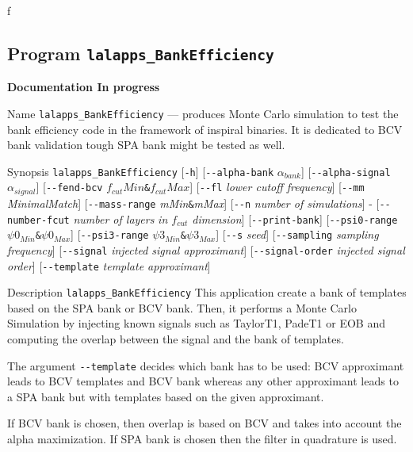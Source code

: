 f\subsection{Program \texttt{lalapps\_BankEfficiency}}
\label{program:lalapps-BankEfficiency}
{\LARGE{{\bf Documentation In progress}}}

\begin{entry}

\item[Name]
\verb$lalapps_BankEfficiency$ --- produces Monte Carlo simulation to test the bank efficiency
code in the framework of inspiral binaries. It is dedicated to BCV bank validation tough 
SPA bank might be tested as well.

\item[Synopsis]
\verb$lalapps_BankEfficiency$ [\verb$-h$] 
[\verb$--alpha-bank$   \textit{$\alpha_{bank}$}]
[\verb$--alpha-signal$ \textit{$\alpha_{signal}$}]
[\verb$--fend-bcv$     \textit{$f_{cut}Min$}\texttt{\&}\textit{$f_{cut}Max$}]
[\verb$--fl$	\textit{lower cutoff frequency}]
[\verb$--mm$ \textit{MinimalMatch}]
[\verb$--mass-range$ \textit{mMin}\texttt{\&}\textit{mMax}]
[\verb$--n$     \textit{number of simulations}]  - 
[\verb$--number-fcut$ \textit{number of layers } \textit{ in $f_{cut}$ dimension}]
[\verb$--print-bank$]
[\verb$--psi0-range$ \textit{$\psi0_{Min}$}\texttt{\&}\textit{$\psi0_{Max}$}]
[\verb$--psi3-range$ \textit{$\psi3_{Min}$}\texttt{\&}\textit{$\psi3_{Max}$}]
[\verb$--s$ \textit{seed}]
[\verb$--sampling$ \textit{sampling frequency}]
[\verb$--signal$ \textit{injected signal approximant}]
[\verb$--signal-order$ \textit{injected signal order}]
[\verb$--template$ \textit{template approximant}]





\item[Description]
\verb$lalapps_BankEfficiency$ This application create a bank of templates based on the
SPA bank or BCV bank. Then, it performs a Monte Carlo Simulation by injecting known signals
such as TaylorT1, PadeT1 or EOB and computing the overlap between the signal and the 
bank of templates.
 
The argument \verb$--template$  decides which bank has to be used: BCV approximant leads 
to BCV templates and BCV bank whereas any other approximant leads to a SPA bank but with 
templates based on the given approximant. 

If BCV bank is chosen, then overlap is based on BCV and takes into account the alpha
maximization. If SPA bank is chosen then the filter in quadrature is used.


\end{entry}

